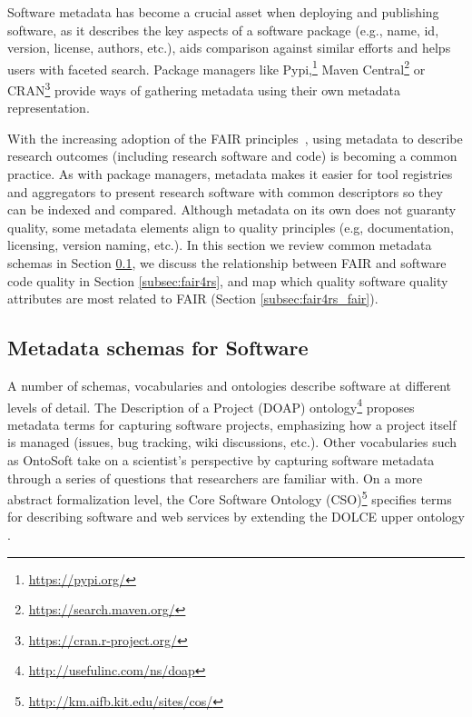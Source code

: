 
Software metadata has become a crucial asset when deploying and publishing software, as it describes the key aspects of a software package (e.g., name, id, version, license, authors, etc.), aids comparison against similar efforts and helps users with faceted search. Package managers like Pypi,\footnote{\url{https://pypi.org/}} Maven Central\footnote{\url{https://search.maven.org/}} or CRAN\footnote{\url{https://cran.r-project.org/}} provide ways of gathering metadata using their own metadata representation.

With the increasing adoption of the FAIR principles~\cite{wilkinson_fair_2016}, using metadata to describe research outcomes (including research software and code) is becoming a common practice. As with package managers, metadata makes it easier for tool registries and aggregators to present research software with common descriptors so they can be indexed and compared. Although metadata on its own does not guaranty quality, some metadata elements align to quality principles (e.g, documentation, licensing, version naming, etc.). In this section we review common metadata schemas in Section \ref{subsec:schemas}, we discuss the relationship between FAIR and software code quality in Section \ref{subsec:fair4rs}, and map  which quality software quality attributes are most related to FAIR (Section \ref{subsec:fair4rs_fair}).

\subsection{Metadata schemas for Software}\label{subsec:schemas}

A number of schemas, vocabularies and ontologies describe software at different levels of detail. The Description of a Project (DOAP) ontology\footnote{\url{http://usefulinc.com/ns/doap}} proposes metadata terms for capturing software projects, emphasizing how a project itself is managed (issues, bug tracking, wiki discussions, etc.). Other vocabularies such as OntoSoft \cite{gil2016ontosoft} take on a scientist's perspective by capturing software metadata through a series of questions that researchers are familiar with. On a more abstract formalization level, the Core Software Ontology (CSO)\footnote{\url{http://km.aifb.kit.edu/sites/cos/}} specifies terms for describing software and web services by extending the DOLCE upper ontology \cite{gangemi2002sweetening}.

